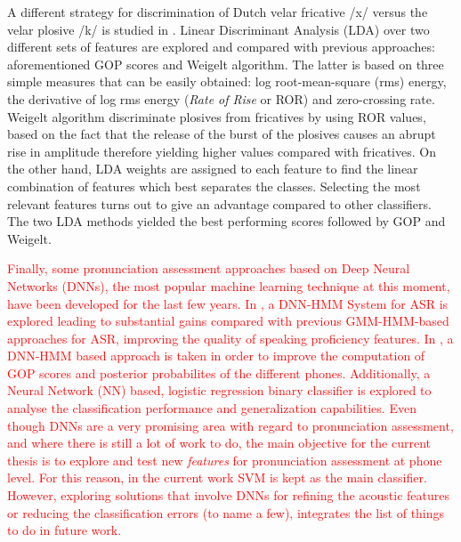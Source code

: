 A different strategy for discrimination of Dutch velar fricative /x/ versus the velar plosive
/k/ is studied in \cite{lda_weigelt}. Linear Discriminant Analysis (LDA) over two different sets
of features are explored and compared with previous approaches: aforementioned GOP scores and
Weigelt algorithm. The latter is based on three simple measures that can be easily obtained:
log root-mean-square (rms) energy, the derivative of log rms energy (\textit{Rate of Rise} or
ROR) and zero-crossing rate. Weigelt algorithm discriminate plosives from fricatives by using
ROR values, based on the fact that the release of the burst of the plosives causes an abrupt
rise in amplitude therefore yielding higher values compared with fricatives.
On the other hand, LDA weights are assigned to each feature to
find the linear combination of features
which best separates the classes. Selecting the most relevant features turns out to give an
advantage compared to other classifiers. The two LDA methods yielded the best performing
scores followed by GOP and Weigelt.

\textcolor{red}{
  Finally, some pronunciation assessment approaches based on Deep Neural Networks (DNNs),
  the most popular machine learning technique at this moment, have been developed for the
  last few years. In \cite{metallinou_2014}, a DNN-HMM System for ASR is explored leading
  to substantial gains compared with previous GMM-HMM-based approaches for ASR,
  improving the quality of speaking proficiency features. In \cite{hu_1, hu_2}, a
  DNN-HMM based approach is taken in order to improve the computation of GOP scores and
  posterior probabilites of the different phones. Additionally, a Neural Network (NN)
  based, logistic regression binary classifier is explored to analyse the
  classification performance and generalization capabilities. Even though DNNs are a very
  promising area with regard to pronunciation assessment, and where there is still a lot
  of work to do, the main objective for the current thesis is to explore and test
  new \textit{features} for pronunciation assessment at phone level. For this reason,
  in the current work SVM is kept as the main classifier. However, exploring solutions
  that involve DNNs for refining the acoustic features or reducing
  the classification errors (to
  name a few), integrates the list of things to do in future work.
}

